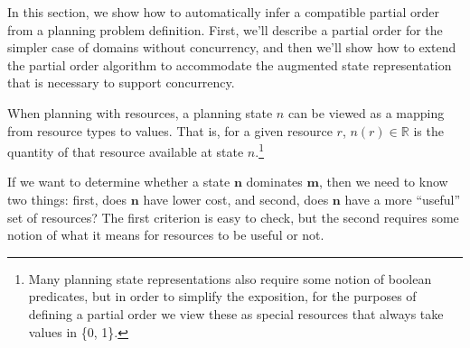 \documentclass[letterpaper]{article}
\theoremstyle{plain} \newtheorem{theorem}{Theorem} \newtheorem{proposition}{Proposition} \newtheorem{lemma}{Lemma}
\theoremstyle{definition} \newtheorem{definition}{Definition} \newtheorem{conjecture}{Conjecture} \newtheorem*{example}{Example}
\theoremstyle{remark} \newtheorem*{remark}{Remark} \newtheorem*{note}{Note} \newtheorem{case}{Case}
\newcommand{\R}{\mathbb{R}}
\begin{document}
In this section, we show how to automatically infer a compatible partial order from a
planning problem definition. First, we'll describe a partial order for the simpler case of
domains without concurrency, and then we'll show how to extend the partial order algorithm
to accommodate the augmented state representation that is necessary to support concurrency.

When planning with resources, a planning state $n$ can be viewed as a mapping from resource
types to values. That is, for a given resource $r$, $n(r) \in \R$ is the quantity of that
resource available at state $n$.\footnote{Many planning state representations also require
some notion of boolean predicates, but in order to simplify the exposition, for the
purposes of defining a partial order we view these as special resources that always take
values in \{0, 1\}.}

If we want to determine whether a state $\mathbf{n}$ dominates $\mathbf{m}$, then we need
to know two things: first, does $\mathbf{n}$ have lower cost, and second, does $\mathbf{n}$
have a more ``useful'' set of resources? The first criterion is easy to check, but the
second requires some notion of what it means for resources to be useful or not.
\end{document}
